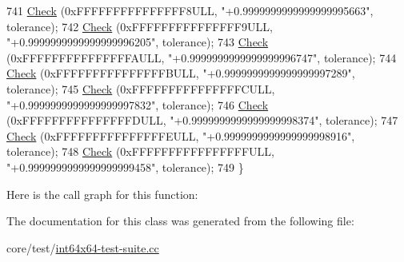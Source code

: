 \begin{DoxyCode}
741   \hyperlink{classns3_1_1int64x64_1_1test_1_1Int64x64Bug1786TestCase_aa4b4b833335ea1266a4f7f5f0e314b5b}{Check} (0xFFFFFFFFFFFFFFF8ULL, \textcolor{stringliteral}{"+0.9999999999999999995663"}, tolerance);
742   \hyperlink{classns3_1_1int64x64_1_1test_1_1Int64x64Bug1786TestCase_aa4b4b833335ea1266a4f7f5f0e314b5b}{Check} (0xFFFFFFFFFFFFFFF9ULL, \textcolor{stringliteral}{"+0.9999999999999999996205"}, tolerance);
743   \hyperlink{classns3_1_1int64x64_1_1test_1_1Int64x64Bug1786TestCase_aa4b4b833335ea1266a4f7f5f0e314b5b}{Check} (0xFFFFFFFFFFFFFFFAULL, \textcolor{stringliteral}{"+0.9999999999999999996747"}, tolerance);
744   \hyperlink{classns3_1_1int64x64_1_1test_1_1Int64x64Bug1786TestCase_aa4b4b833335ea1266a4f7f5f0e314b5b}{Check} (0xFFFFFFFFFFFFFFFBULL, \textcolor{stringliteral}{"+0.9999999999999999997289"}, tolerance);
745   \hyperlink{classns3_1_1int64x64_1_1test_1_1Int64x64Bug1786TestCase_aa4b4b833335ea1266a4f7f5f0e314b5b}{Check} (0xFFFFFFFFFFFFFFFCULL, \textcolor{stringliteral}{"+0.9999999999999999997832"}, tolerance);
746   \hyperlink{classns3_1_1int64x64_1_1test_1_1Int64x64Bug1786TestCase_aa4b4b833335ea1266a4f7f5f0e314b5b}{Check} (0xFFFFFFFFFFFFFFFDULL, \textcolor{stringliteral}{"+0.9999999999999999998374"}, tolerance);
747   \hyperlink{classns3_1_1int64x64_1_1test_1_1Int64x64Bug1786TestCase_aa4b4b833335ea1266a4f7f5f0e314b5b}{Check} (0xFFFFFFFFFFFFFFFEULL, \textcolor{stringliteral}{"+0.9999999999999999998916"}, tolerance);
748   \hyperlink{classns3_1_1int64x64_1_1test_1_1Int64x64Bug1786TestCase_aa4b4b833335ea1266a4f7f5f0e314b5b}{Check} (0xFFFFFFFFFFFFFFFFULL, \textcolor{stringliteral}{"+0.9999999999999999999458"}, tolerance);
749 \}
\end{DoxyCode}


Here is the call graph for this function\+:




The documentation for this class was generated from the following file\+:\begin{DoxyCompactItemize}
\item 
core/test/\hyperlink{int64x64-test-suite_8cc}{int64x64-\/test-\/suite.\+cc}\end{DoxyCompactItemize}
